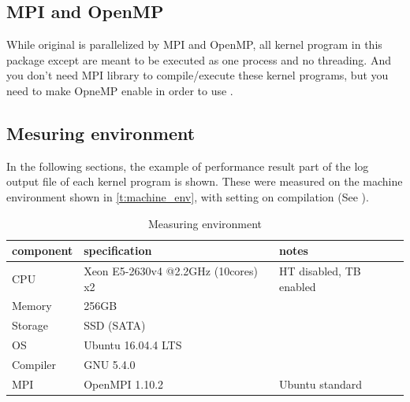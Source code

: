 \subsection{MPI and OpenMP}\label{s:mpi_openmpi}

While original \NICAM is parallelized by MPI and OpenMP,
all kernel program in this package except 
are meant to be executed as one process and no threading.
%
And you don't need MPI library to compile/execute these kernel programs,
but you need to make OpneMP enable in order to use .

\subsection{Mesuring environment}\label{s:measuring_env}

In the following sections, the example of performance result part of the
log output file of each kernel program is shown.
%
These were measured on the machine environment shown in
\autoref{t:machine_env},
with setting  on compilation
(See ).


\begin{table}[htbp]
\centering
\caption{Measuring environment}\label{t:machine_env}
\small
\begin{tabularx}{.8\textwidth}{llX}
\hline
component & specification & notes \\
\hline
 CPU & Xeon E5-2630v4 @2.2GHz (10cores) x2 & HT disabled, TB enabled\\
 Memory & 256GB &\\
 Storage & SSD (SATA) &\\
 OS & Ubuntu 16.04.4 LTS &\\
 Compiler & GNU 5.4.0 & \\
 MPI & OpenMPI 1.10.2 & Ubuntu standard \\
\hline
\end{tabularx}
\end{table}



